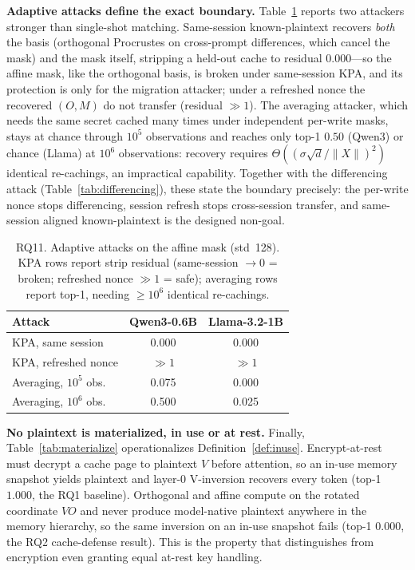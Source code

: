 \textbf{Adaptive attacks define the exact boundary.} Table~\ref{tab:adaptive} reports two attackers stronger than single-shot matching. Same-session known-plaintext recovers \emph{both} the basis (orthogonal Procrustes on cross-prompt differences, which cancel the mask) and the mask itself, stripping a held-out cache to residual $0.000$---so the affine mask, like the orthogonal basis, is broken under same-session KPA, and its protection is only for the migration attacker; under a refreshed nonce the recovered $(O,M)$ do not transfer (residual $\gg 1$). The averaging attacker, which needs the same secret cached many times under independent per-write masks, stays at chance through $10^5$ observations and reaches only top-1 $0.50$ (Qwen3) or chance (Llama) at $10^6$ observations: recovery requires $\Theta((\sigma\sqrt{d}/\lVert X\rVert)^2)$ identical re-cachings, an impractical capability. Together with the differencing attack (Table~\ref{tab:differencing}), these state the boundary precisely: the per-write nonce stops differencing, session refresh stops cross-session transfer, and same-session aligned known-plaintext is the designed non-goal.

\begin{table}[t]
\centering
\caption{RQ11. Adaptive attacks on the affine mask (std~128). KPA rows report strip residual (same-session $\to 0$ = broken; refreshed nonce $\gg 1$ = safe); averaging rows report top-1, needing $\ge 10^6$ identical re-cachings.}
\label{tab:adaptive}
\begin{tabular}{@{}lcc@{}}
\toprule
Attack & Qwen3-0.6B & Llama-3.2-1B \\
\midrule
KPA, same session & 0.000 & 0.000 \\
KPA, refreshed nonce & $\gg 1$ & $\gg 1$ \\
Averaging, $10^5$ obs. & 0.075 & 0.000 \\
Averaging, $10^6$ obs. & 0.500 & 0.025 \\
\bottomrule
\end{tabular}
\end{table}

\textbf{No plaintext is materialized, in use or at rest.} Finally, Table~\ref{tab:materialize} operationalizes Definition~\ref{def:inuse}. Encrypt-at-rest must decrypt a cache page to plaintext $V$ before attention, so an in-use memory snapshot yields plaintext and layer-0 V-inversion recovers every token (top-1 $1.000$, the RQ1 baseline). Orthogonal and affine \sys{} compute on the rotated coordinate $VO$ and never produce model-native plaintext anywhere in the memory hierarchy, so the same inversion on an in-use snapshot fails (top-1 $0.000$, the RQ2 cache-defense result). This is the property that distinguishes \sys{} from encryption even granting equal at-rest key handling.

